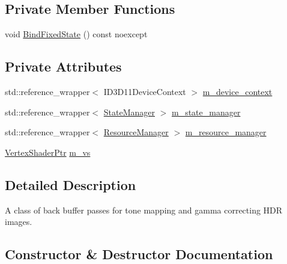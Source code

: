 \subsection*{Private Member Functions}
\begin{DoxyCompactItemize}
\item 
void \hyperlink{classmage_1_1rendering_1_1_back_buffer_pass_a45aafe0681a6e0598d088dbf3954cfb7}{Bind\+Fixed\+State} () const noexcept
\end{DoxyCompactItemize}
\subsection*{Private Attributes}
\begin{DoxyCompactItemize}
\item 
std\+::reference\+\_\+wrapper$<$ I\+D3\+D11\+Device\+Context $>$ \hyperlink{classmage_1_1rendering_1_1_back_buffer_pass_ae87c0cf8b2ffe627ac44faaf61791b4f}{m\+\_\+device\+\_\+context}
\item 
std\+::reference\+\_\+wrapper$<$ \hyperlink{classmage_1_1rendering_1_1_state_manager}{State\+Manager} $>$ \hyperlink{classmage_1_1rendering_1_1_back_buffer_pass_a5d10a44c5f8a3529d64aabfb590156f2}{m\+\_\+state\+\_\+manager}
\item 
std\+::reference\+\_\+wrapper$<$ \hyperlink{classmage_1_1rendering_1_1_resource_manager}{Resource\+Manager} $>$ \hyperlink{classmage_1_1rendering_1_1_back_buffer_pass_ac13f6af3893cec667d6ab1b0da7b2a94}{m\+\_\+resource\+\_\+manager}
\item 
\hyperlink{namespacemage_1_1rendering_aaf704b9c54a4181f4950a1761de69dda}{Vertex\+Shader\+Ptr} \hyperlink{classmage_1_1rendering_1_1_back_buffer_pass_a12a95cc800090a0bc01d14a9f5903748}{m\+\_\+vs}
\end{DoxyCompactItemize}


\subsection{Detailed Description}
A class of back buffer passes for tone mapping and gamma correcting H\+DR images. 

\subsection{Constructor \& Destructor Documentation}
\hypertarget{classmage_1_1rendering_1_1_back_buffer_pass_a054aad27e4b3d05baf235ae256934ef2}{}\label{classmage_1_1rendering_1_1_back_buffer_pass_a054aad27e4b3d05baf235ae256934ef2} 
